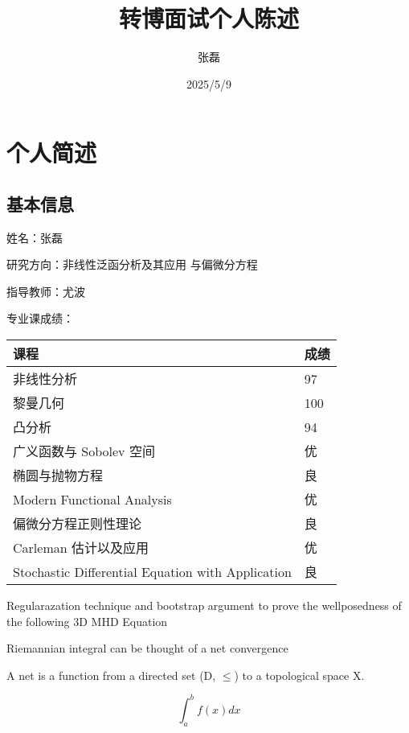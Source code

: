 \documentclass{beamer}
\title{转博面试个人陈述}
\author{张磊}
\institute{西安交通大学数学学院}
\date{2025/5/9}
\begin{document}

\section{个人简述}
\subsection{基本信息}

\begin{frame}
姓名：张磊

研究方向：非线性泛函分析及其应用 与偏微分方程

指导教师：尤波

专业课成绩：
\begin{tabular}{|l|l|}

\hline 课程 & 成绩 \\
\hline 非线性分析 & 97\\
\hline  黎曼几何 & 100  \\
\hline 凸分析 & 94 \\
\hline 广义函数与 Sobolev 空间 & 优 \\
\hline 椭圆与抛物方程 & 良 \\
\hline Modern Functional Analysis & 优   \\
\hline 偏微分方程正则性理论 & 良  \\
\hline Carleman 估计以及应用 & 优 \\
\hline Stochastic Differential Equation with Application & 良 \\
\hline
\end{tabular}

\end{frame}

\begin{frame}
    Regularazation technique and bootstrap argument to prove the wellposedness
    of the following 3D MHD Equation

    Riemannian integral can be thought of a net convergence

    \begin{definition}
        A net is a function from a directed set (D, $\leq$) to a topological space
        X.
    \end{definition}
    \begin{equation}
        \int_{a}^{b}f(x)dx
    \end{equation}


\end{frame}
\end{document}
